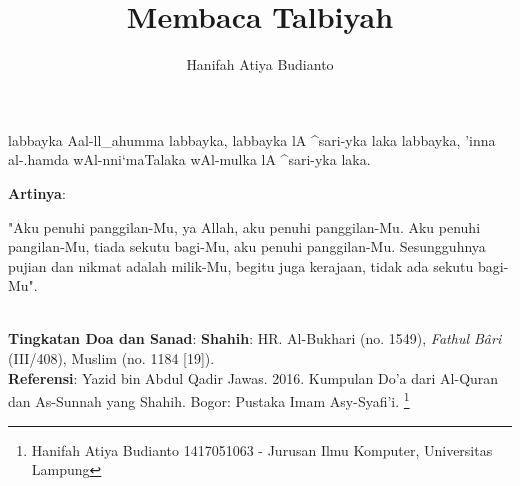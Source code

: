 \documentclass[a4paper,12pt]{article}
\title{\Large Membaca Talbiyah}
\author{\calligra Hanifah Atiya Budianto}
\begin{document}
\sffamily
\maketitle 
\fullvocalize
{}
\begin{arabtext}
\noindent
labbayka Aal-ll_ahumma labbayka, labbayka lA ^sari-yka laka labbayka, 'inna 
al-.hamda wAl-nni`maTalaka wAl-mulka lA ^sari-yka laka.\\
\end{arabtext}
\noindent
\textbf{Artinya}:
\par
\indent
"Aku penuhi panggilan-Mu, ya Allah, aku penuhi panggilan-Mu. Aku penuhi 
pangilan-Mu, tiada sekutu bagi-Mu, aku penuhi panggilan-Mu. Sesungguhnya 
pujian dan nikmat adalah milik-Mu, begitu juga kerajaan, tidak ada sekutu 
bagi-Mu".\\\\
\par
\noindent
\textbf{Tingkatan Doa dan Sanad}: \textbf{Shahih}: HR. Al-Bukhari (no. 
1549), \textit{Fathul B\^{a}ri} (III/408), Muslim (no. 1184 [19]).\\
\textbf{Referensi}: Yazid bin Abdul Qadir Jawas. 2016. Kumpulan Do'a dari
Al-Quran dan As-Sunnah yang Shahih. Bogor: Pustaka Imam Asy-Syafi'i.
\footnote{Hanifah Atiya Budianto 1417051063 - Jurusan Ilmu Komputer,
Universitas Lampung}
\end{document}
